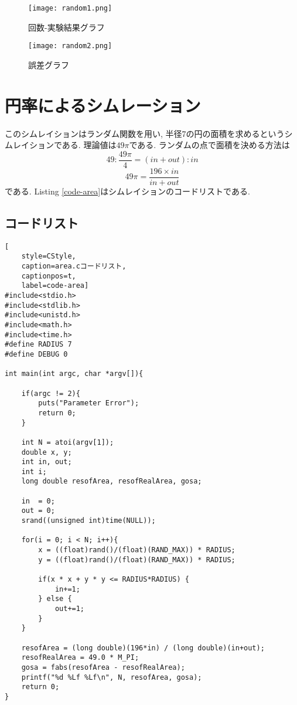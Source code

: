 \documentclass[a4j, titlepage]{jarticle}
\begin{document}
\begin{figure}[tbh]
    \centering \texttt{[image: random1.png]}
    \caption{回数-実験結果グラフ}
    \label{graph:random1}
\end{figure}

\begin{figure}[tbh]
    \centering \texttt{[image: random2.png]}
    \caption{誤差グラフ}
    \label{graph:random-gosa}
\end{figure}


\section{円率によるシムレーション}
このシムレイションはランダム関数を用い, 半径7の円の面積を求めるというシムレイションである. 理論値は$49\pi$である.
ランダムの点で面積を決める方法は
\[49 : \frac{49\pi}{4} = (in + out) : in \] 
\[49\pi = \frac{196 \times in}{in + out}\]    
である. Listing \ref{code-area}はシムレイションのコードリストである.
\subsection{コードリスト}
\begin{lstlisting}[
    style=CStyle, 
    caption=area.cコードリスト,
    captionpos=t,
    label=code-area]
#include<stdio.h>
#include<stdlib.h>
#include<unistd.h>
#include<math.h>
#include<time.h>
#define RADIUS 7
#define DEBUG 0

int main(int argc, char *argv[]){

    if(argc != 2){              
        puts("Parameter Error");
        return 0;
    }

    int N = atoi(argv[1]);    
    double x, y;
    int in, out;
    int i;
    long double resofArea, resofRealArea, gosa;
    
    in  = 0;
    out = 0;
    srand((unsigned int)time(NULL));

    for(i = 0; i < N; i++){
        x = ((float)rand()/(float)(RAND_MAX)) * RADIUS;
        y = ((float)rand()/(float)(RAND_MAX)) * RADIUS;

        if(x * x + y * y <= RADIUS*RADIUS) {
            in+=1;
        } else {
            out+=1;
        }
    }

    resofArea = (long double)(196*in) / (long double)(in+out);
    resofRealArea = 49.0 * M_PI;
    gosa = fabs(resofArea - resofRealArea);
    printf("%d %Lf %Lf\n", N, resofArea, gosa);
    return 0;
}
\end{lstlisting}
\end{document}
